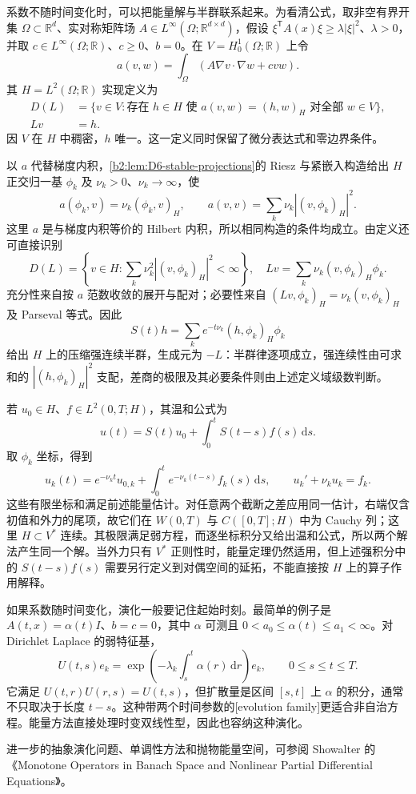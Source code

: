 \ProseParagraphBreak

系数不随时间变化时，可以把能量解与半群联系起来。为看清公式，取非空有界开集 \(\Omega\subset\mathbb R^d\)、实对称矩阵场 \(A\in L^\infty(\Omega;\mathbb R^{d\times d})\)，假设 \(\xi^{\mathsf T}A(x)\xi\geq\lambda|\xi|^2\)、\(\lambda>0\)，并取 \(c\in L^\infty(\Omega;\mathbb R)\)、\(c\geq0\)、\(b=0\)。在 \(V=H_0^1(\Omega;\mathbb R)\) 上令
\[
 a(v,w)=\int_\Omega(A\nabla v\cdot\nabla w+cvw).
\]
其 \(H=L^2(\Omega;\mathbb R)\) 实现定义为
\[
 \begin{aligned}
 D(L)&=\{v\in V:\text{存在 }h\in H\text{ 使 }a(v,w)=(h,w)_H
                         \text{ 对全部 }w\in V\},\\
 Lv&=h.
 \end{aligned}
\]
因 \(V\) 在 \(H\) 中稠密，\(h\) 唯一。这一定义同时保留了微分表达式和零边界条件。

\ProseParagraphBreak

以 \(a\) 代替梯度内积，\cref{b2:lem:D6-stable-projections}的 Riesz 与紧嵌入构造给出 \(H\) 正交归一基 \(\phi_k\) 及 \(\nu_k>0\)、\(\nu_k\to\infty\)，使
\[
 a(\phi_k,v)=\nu_k(\phi_k,v)_H,\qquad
 a(v,v)=\sum_k\nu_k|(v,\phi_k)_H|^2.
\]
这里 \(a\) 是与梯度内积等价的 Hilbert 内积，所以相同构造的条件均成立。由定义还可直接识别
\[
 D(L)=\left\{v\in H:\sum_k\nu_k^2|(v,\phi_k)_H|^2<\infty\right\},
 \quad Lv=\sum_k\nu_k(v,\phi_k)_H\phi_k.
\]
充分性来自按 \(a\) 范数收敛的展开与配对；必要性来自 \((Lv,\phi_k)_H=\nu_k(v,\phi_k)_H\) 及 Parseval 等式。因此
\[
 S(t)h=\sum_k e^{-t\nu_k}(h,\phi_k)_H\phi_k
\]
给出 \(H\) 上的压缩强连续半群，生成元为 \(-L\)：半群律逐项成立，强连续性由可求和的 \(|(h,\phi_k)_H|^2\) 支配，差商的极限及其必要条件则由上述定义域级数判断。

\ProseParagraphBreak

若 \(u_0\in H\)、\(f\in L^2(0,T;H)\)，其温和公式为
\[
 u(t)=S(t)u_0+\int_0^t S(t-s)f(s)\,\mathrm ds.
\]
取 \(\phi_k\) 坐标，得到
\[
 u_k(t)=e^{-\nu_kt}u_{0,k}
       +\int_0^t e^{-\nu_k(t-s)}f_k(s)\,\mathrm ds,
 \qquad u_k'+\nu_ku_k=f_k.
\]
这些有限坐标和满足前述能量估计。对任意两个截断之差应用同一估计，右端仅含初值和外力的尾项，故它们在 \(W(0,T)\) 与 \(C([0,T];H)\) 中为 Cauchy 列；这里 \(H\subset V^*\) 连续。其极限满足弱方程，而逐坐标积分又给出温和公式，所以两个解法产生同一个解。当外力只有 \(V^*\) 正则性时，能量定理仍然适用，但上述强积分中的 \(S(t-s)f(s)\) 需要另行定义到对偶空间的延拓，不能直接按 \(H\) 上的算子作用解释。

\ProseParagraphBreak

如果系数随时间变化，演化一般要记住起始时刻。最简单的例子是 \(A(t,x)=\alpha(t)I\)、\(b=c=0\)，其中 \(\alpha\) 可测且 \(0<a_0\leq\alpha(t)\leq a_1<\infty\)。对 Dirichlet Laplace 的弱特征基，
\[
 U(t,s)e_k=\exp\left(-\lambda_k\int_s^t\alpha(r)\,\mathrm dr\right)e_k,
 \qquad 0\leq s\leq t\leq T.
\]
它满足 \(U(t,r)U(r,s)=U(t,s)\)，但扩散量是区间 \([s,t]\) 上 \(\alpha\) 的积分，通常不只取决于长度 \(t-s\)。这种带两个时间参数的[evolution family]更适合非自治方程。能量方法直接处理时变双线性型，因此也容纳这种演化。

进一步的抽象演化问题、单调性方法和抛物能量空间，可参阅 Showalter 的《Monotone Operators in Banach Space and Nonlinear Partial Differential Equations》\cite{Showalter1997Monotone}。
